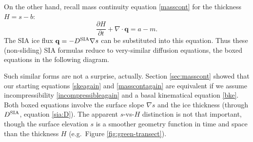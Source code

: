 \documentclass[letterpaper,final,12pt,reqno]{amsart}
\newcommand{\bn}{\mathbf{n}}
\newcommand{\bq}{\mathbf{q}}
\newcommand{\bu}{\mathbf{u}}
\newcommand{\grad}{\nabla}
\newcommand{\Div}{\nabla\cdot}
\newcommand{\Dsia}{D^{\text{\textrm{SIA}}}}
\newcommand{\ds}{\displaystyle}
\begin{document}
On the other hand, recall mass continuity equation \eqref{masscont} for the thickness $H=s-b$:
\begin{equation}
\frac{\partial H}{\partial t} + \Div \bq = a - m.  \label{masscontagain}
\end{equation}
The SIA ice flux $\bq = - \Dsia \grad s$ can be substituted into this equation.  Thus these (non-sliding) SIA formulas reduce to very-similar diffusion equations, the boxed equations in the following diagram.

\medskip
\begin{center}
\end{center}

\medskip
Such similar forms are not a surprise, actually.  Section \ref{sec:masscont} showed that our starting equations \eqref{skeagain} and \eqref{masscontagain} are equivalent if we assume incompressibility \eqref{incompressibleagain} and a basal kinematical equation \eqref{bke}.    Both boxed equations involve the surface slope $\grad s$ and the ice thickness (through $\Dsia$, equation \eqref{sia:D}).  The apparent $s$-vs-$H$ distinction is not that important, though the surface elevation $s$ is a smoother geometry function in time and space than the thickness $H$ (e.g.~Figure \ref{fig:green-transect}).
\end{document}
